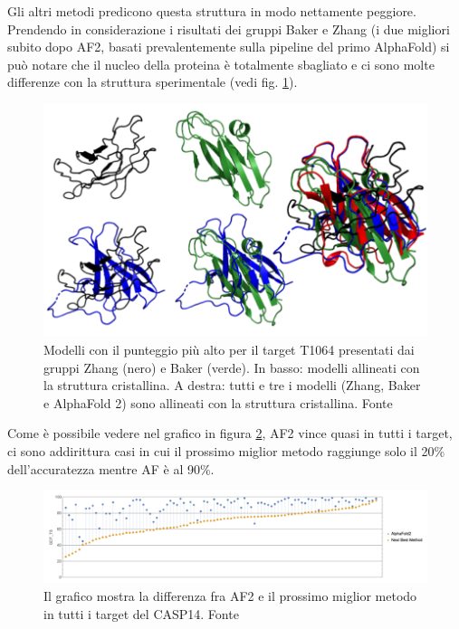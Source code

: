 Gli altri metodi predicono questa struttura in modo nettamente peggiore. Prendendo in considerazione i risultati dei gruppi Baker e Zhang (i due migliori subito dopo AF2, basati prevalentemente sulla pipeline del primo AlphaFold)  si può notare che il nucleo della proteina è totalmente sbagliato e ci sono molte differenze con la struttura sperimentale (vedi fig. \ref{fig:altri-modelli-t1064}).

\begin{figure}[!htb]
	\centering
	\includegraphics[scale=0.7]{images/t1064-altri-modelli.png}
	\caption{Modelli con il punteggio più alto per il target T1064 presentati dai gruppi Zhang (nero) e Baker (verde). In basso: modelli allineati con la struttura cristallina. A destra: tutti e tre i modelli (Zhang, Baker e AlphaFold 2) sono allineati con la struttura cristallina. Fonte\cite{blopigAF}}
	\label{fig:altri-modelli-t1064}
\end{figure}

Come è possibile vedere nel grafico in figura \ref{fig:modelli-casp14}, AF2 vince quasi in tutti i target, ci sono addirittura casi in cui il prossimo miglior metodo raggiunge solo il 20\% dell'accuratezza mentre AF è al 90\%.

\begin{figure}[!htb]
	\centering
	\includegraphics[scale=0.4]{images/models1.png}
	\caption{Il grafico mostra la differenza fra AF2 e il prossimo miglior metodo in tutti i target del CASP14. Fonte\cite{moAlq}}
	\label{fig:modelli-casp14}
\end{figure}

